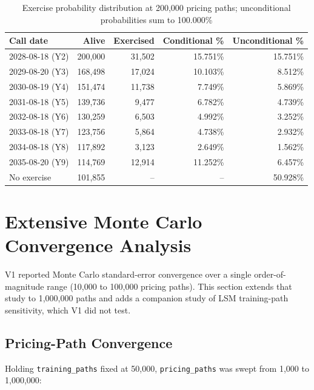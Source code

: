 \documentclass[conference]{IEEEtran}
\begin{document}
\begin{table}[!t]
\centering
\begin{tabular}{lrrrr}
\toprule
\textbf{Call date} & \textbf{Alive} & \textbf{Exercised} & \textbf{Conditional \%} & \textbf{Unconditional \%} \\
\midrule
2028-08-18 (Y2) & 200,000 & 31,502 & 15.751\% & 15.751\% \\
2029-08-20 (Y3) & 168,498 & 17,024 & 10.103\% & 8.512\% \\
2030-08-19 (Y4) & 151,474 & 11,738 & 7.749\% & 5.869\% \\
2031-08-18 (Y5) & 139,736 & 9,477 & 6.782\% & 4.739\% \\
2032-08-18 (Y6) & 130,259 & 6,503 & 4.992\% & 3.252\% \\
2033-08-18 (Y7) & 123,756 & 5,864 & 4.738\% & 2.932\% \\
2034-08-18 (Y8) & 117,892 & 3,123 & 2.649\% & 1.562\% \\
2035-08-20 (Y9) & 114,769 & 12,914 & 11.252\% & 6.457\% \\
No exercise & 101,855 & -- & -- & 50.928\% \\
\bottomrule
\end{tabular}
\caption{Exercise probability distribution at 200,000 pricing paths; unconditional probabilities sum to 100.000\%}
\end{table}

\section{Extensive Monte Carlo Convergence Analysis}
\label{sec:convergence}

V1 reported Monte Carlo standard-error convergence over a single order-of-magnitude range (10,000 to 100,000 pricing paths). This section extends that study to 1,000,000 paths and adds a companion study of LSM training-path sensitivity, which V1 did not test.

\subsection{Pricing-Path Convergence}

Holding \texttt{training\_paths} fixed at 50,000, \texttt{pricing\_paths} was swept from 1,000 to 1,000,000:
\end{document}
